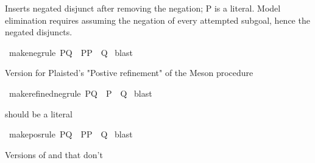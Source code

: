 \begin{isabellebody}
\begin{isamarkuptext}
\end{isamarkuptext}\isamarkuptrue%
%
\begin{isamarkuptext}%
Inserts negated disjunct after removing the negation; P is a literal.
  Model elimination requires assuming the negation of every attempted subgoal,
  hence the negated disjuncts.%
\end{isamarkuptext}\isamarkuptrue%
\isamarkupfalse%
\ make{\isacharunderscore}{\kern0pt}neg{\isacharunderscore}{\kern0pt}rule{\isacharcolon}{\kern0pt}\ {\isachardoublequoteopen}{\isasymnot}P{\isasymor}Q\ {\isasymLongrightarrow}\ {\isacharparenleft}{\kern0pt}{\isacharparenleft}{\kern0pt}{\isasymnot}P{\isasymLongrightarrow}P{\isacharparenright}{\kern0pt}\ {\isasymLongrightarrow}\ Q{\isacharparenright}{\kern0pt}{\isachardoublequoteclose}\isanewline
%
\isadelimproof
%
\endisadelimproof
%
\isatagproof
{}\isamarkupfalse%
\ blast%
\endisatagproof
{\isafoldproof}%
%
\isadelimproof
%
\endisadelimproof
%
\begin{isamarkuptext}%
Version for Plaisted's "Postive refinement" of the Meson procedure%
\end{isamarkuptext}\isamarkuptrue%
\isamarkupfalse%
\ make{\isacharunderscore}{\kern0pt}refined{\isacharunderscore}{\kern0pt}neg{\isacharunderscore}{\kern0pt}rule{\isacharcolon}{\kern0pt}\ {\isachardoublequoteopen}{\isasymnot}P{\isasymor}Q\ {\isasymLongrightarrow}\ {\isacharparenleft}{\kern0pt}P\ {\isasymLongrightarrow}\ Q{\isacharparenright}{\kern0pt}{\isachardoublequoteclose}\isanewline
%
\isadelimproof
%
\endisadelimproof
%
\isatagproof
{}\isamarkupfalse%
\ blast%
\endisatagproof
{\isafoldproof}%
%
\isadelimproof
%
\endisadelimproof
%
\begin{isamarkuptext}%
 should be a literal%
\end{isamarkuptext}\isamarkuptrue%
\isamarkupfalse%
\ make{\isacharunderscore}{\kern0pt}pos{\isacharunderscore}{\kern0pt}rule{\isacharcolon}{\kern0pt}\ {\isachardoublequoteopen}P{\isasymor}Q\ {\isasymLongrightarrow}\ {\isacharparenleft}{\kern0pt}{\isacharparenleft}{\kern0pt}P{\isasymLongrightarrow}{\isasymnot}P{\isacharparenright}{\kern0pt}\ {\isasymLongrightarrow}\ Q{\isacharparenright}{\kern0pt}{\isachardoublequoteclose}\isanewline
%
\isadelimproof
%
\endisadelimproof
%
\isatagproof
{}\isamarkupfalse%
\ blast%
\endisatagproof
{\isafoldproof}%
%
\isadelimproof
%
\endisadelimproof
%
\begin{isamarkuptext}%
Versions of  and  that don't

\end{isamarkuptext}
\end{isabellebody}
